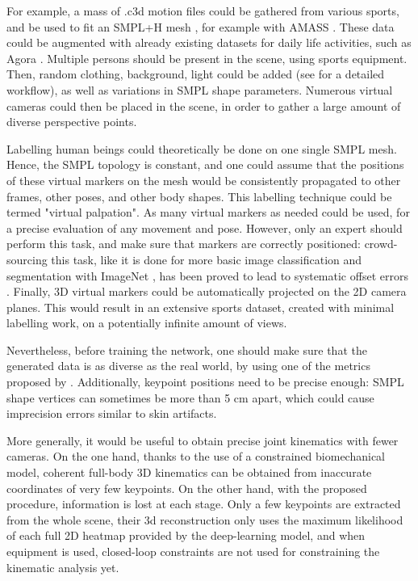 For example, a mass of .c3d motion files could be gathered from various sports, and be used to fit an SMPL+H mesh \cite{Pavlakos2019}, for example with AMASS \cite{Mahmood2019}. These data could be augmented with already existing datasets for daily life activities, such as Agora \cite{Patel2021}. Multiple persons should be present in the scene, using sports equipment. Then, random clothing, background, light could be added (see \cite{Wood2021,Bolanos2021} for a detailed workflow), as well as variations in SMPL shape parameters. Numerous virtual cameras could then be placed in the scene, in order to gather a large amount of diverse perspective points.

Labelling human beings could theoretically be done on one single SMPL mesh. Hence, the SMPL topology is constant, and one could assume that the positions of these virtual markers on the mesh would be consistently propagated to other frames, other poses, and other body shapes. This labelling technique could be termed "virtual palpation". As many virtual markers as needed could be used, for a precise evaluation of any movement and pose. However, only an expert should perform this task, and make sure that markers are correctly positioned: crowd-sourcing this task, like it is done for more basic image classification and segmentation with ImageNet \cite{Deng2009}, has been proved to lead to systematic offset errors \cite{Needham2021b}. Finally, 3D virtual markers could be automatically projected on the 2D camera planes. This would result in an extensive sports dataset, created with minimal labelling work, on a potentially infinite amount of views. 

Nevertheless, before training the network, one should make sure that the generated data is as diverse as the real world, by using one of the metrics proposed by \cite{Borji2019, Borji2022}. Additionally, keypoint positions need to be precise enough: SMPL shape vertices can sometimes be more than 5 cm apart, which could cause imprecision errors similar to skin artifacts. 

\vspace*{1.5cm}
More generally, it would be useful to obtain precise joint kinematics with fewer cameras. On the one hand, thanks to the use of a constrained biomechanical model, coherent full-body 3D kinematics can be obtained from inaccurate coordinates of very few keypoints. On the other hand, with the proposed procedure, information is lost at each stage. Only a few keypoints are extracted from the whole scene, their 3d reconstruction only uses the maximum likelihood of each full 2D heatmap provided by the deep-learning model, and when equipment is used, closed-loop constraints are not used for constraining the kinematic analysis yet.

